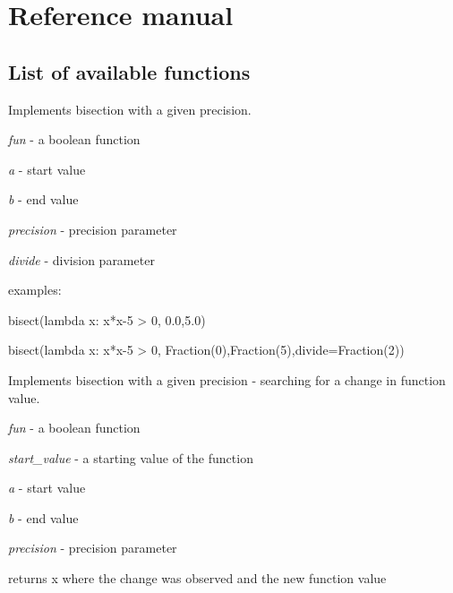 \documentclass[a4paper,10pt,english]{sphinxmanual}
\begin{document}
\chapter{Reference manual}	
\section{List of available functions}
\begin{fulllineitems}
	\label{index:chondro.bisect}
	Implements bisection with a given precision.
	
	\emph{fun} - a boolean function
	
	\emph{a} - start value
	
	\emph{b} - end value
	
	\emph{precision} - precision parameter
	
	\emph{divide} - division parameter
	
	examples:
	
	bisect(lambda x: x*x-5 \textgreater{} 0, 0.0,5.0)
	
	bisect(lambda x: x*x-5 \textgreater{} 0, Fraction(0),Fraction(5),divide=Fraction(2))
	
\end{fulllineitems}


\begin{fulllineitems}
	\label{index:chondro.bisect_change}
	Implements bisection with a given precision - searching for a change 
	in function value.
	
	\emph{fun} - a boolean function
	
	\emph{start\_value} - a starting value of the function
	
	\emph{a} - start value
	
	\emph{b} - end value
	
	\emph{precision} - precision parameter
	
	returns x where the change was observed and the new function value
	
\end{fulllineitems}

\end{document}
